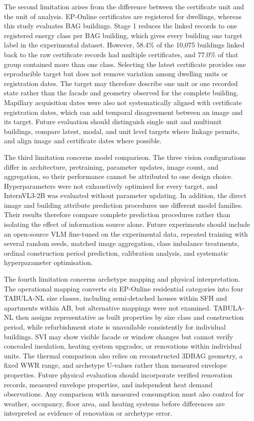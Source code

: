 The second limitation arises from the difference between the certificate unit and the unit of analysis. EP-Online certificates are registered for dwellings, whereas this study evaluates BAG buildings. Stage 1 reduces the linked records to one registered energy class per BAG building, which gives every building one target label in the experimental dataset. However, 58.4\% of the 10,075 buildings linked back to the raw certificate records had multiple certificates, and 77.0\% of that group contained more than one class. Selecting the latest certificate provides one reproducible target but does not remove variation among dwelling units or registration dates. The target may therefore describe one unit or one recorded state rather than the facade and geometry observed for the complete building. Mapillary acquisition dates were also not systematically aligned with certificate registration dates, which can add temporal disagreement between an image and its target. Future evaluation should distinguish single unit and multiunit buildings, compare latest, modal, and unit level targets where linkage permits, and align image and certificate dates where possible.

The third limitation concerns model comparison. The three vision configurations differ in architecture, pretraining, parameter updates, image count, and aggregation, so their performance cannot be attributed to one design choice. Hyperparameters were not exhaustively optimised for every target, and InternVL3-2B was evaluated without parameter updating. In addition, the direct image and building attribute prediction procedures use different model families. Their results therefore compare complete prediction procedures rather than isolating the effect of information source alone. Future experiments should include an open-source \ac{VLM} fine-tuned on the experimental data, repeated training with several random seeds, matched image aggregation, class imbalance treatments, ordinal construction period prediction, calibration analysis, and systematic hyperparameter optimisation.

The fourth limitation concerns archetype mapping and physical interpretation. The operational mapping converts six EP-Online residential categories into four TABULA-NL size classes, including semi-detached houses within SFH and apartments within AB, but alternative mappings were not examined. TABULA-NL then assigns representative as built properties by size class and construction period, while refurbishment state is unavailable consistently for individual buildings. \Ac{SVI} may show visible facade or window changes but cannot verify concealed insulation, heating system upgrades, or renovations within individual units. The thermal comparison also relies on reconstructed 3DBAG geometry, a fixed WWR range, and archetype U-values rather than measured envelope properties. Future physical evaluation should incorporate verified renovation records, measured envelope properties, and independent heat demand observations. Any comparison with measured consumption must also control for weather, occupancy, floor area, and heating systems before differences are interpreted as evidence of renovation or archetype error.

